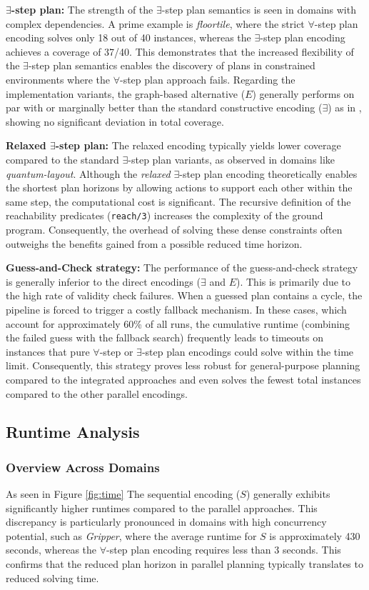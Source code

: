 \documentclass[
     11pt,                    %
     a4paper,             %
     BCOR=10mm,     %
     DIV=14,                 %
     listof=totoc,                    %
     bibliography=totoc,       %
     index=totoc,              %
     parskip            %
     twoside,
     headsepline
     ]{scrreprt}
\theoremstyle{definition}
\theoremstyle{definition}
\theoremstyle{remark}
\theoremstyle{bfnote}
\begin{document}
\textbf{$\exists$-step plan:} The strength of the $\exists$-step plan semantics is seen in domains with complex dependencies. A prime example is \textit{floortile}, where the strict $\forall$-step plan encoding solves only 18 out of 40 instances, whereas the $\exists$-step plan encoding achieves a coverage of 37/40. 
This demonstrates that the increased flexibility of the $\exists$-step plan semantics enables the discovery of plans in constrained environments where the $\forall$-step plan approach fails. 
Regarding the implementation variants, the graph-based alternative ($E$) generally performs on par with or marginally better than the standard constructive encoding ($\exists$) as in \textcite{DIMOPOULOS_2019}, showing no significant deviation in total coverage.

\textbf{Relaxed $\exists$-step plan:} The relaxed encoding typically yields lower coverage compared to the standard $\exists$-step plan variants, as observed in domains like \textit{quantum-layout}. Although the \textit{relaxed} $\exists$-step plan encoding theoretically enables the shortest plan horizons by allowing actions to support each other within the same step, the computational cost is significant.
The recursive definition of the reachability predicates (\texttt{reach/3}) increases the complexity of the ground program.
Consequently, the overhead of solving these dense constraints often outweighs the benefits gained from a possible reduced time horizon.

\textbf{Guess-and-Check strategy:} The performance of the guess-and-check strategy is generally inferior to the direct encodings ($\exists$ and $E$). 
This is primarily due to the high rate of validity check failures. When a guessed plan contains a cycle, the pipeline is forced to trigger a costly fallback mechanism.
In these cases, which account for approximately 60\% of all runs, the cumulative runtime (combining the failed guess with the fallback search) frequently leads to timeouts on instances that pure $\forall$-step or $\exists$-step plan encodings could solve within the time limit.
Consequently, this strategy proves less robust for general-purpose planning compared to the integrated approaches and even solves the fewest total instances compared to the other parallel encodings. 

\subsection{Runtime Analysis}

\subsubsection{Overview Across Domains}
As seen in Figure \ref{fig:time} The sequential encoding ($S$) generally exhibits significantly higher runtimes compared to the parallel approaches. This discrepancy is particularly pronounced in domains with high concurrency potential, such as \textit{Gripper}, where the average runtime for $S$ is approximately 430 seconds, whereas the $\forall$-step plan encoding requires less than 3 seconds. This confirms that the reduced plan horizon in parallel planning typically translates to reduced solving time.
\end{document}
